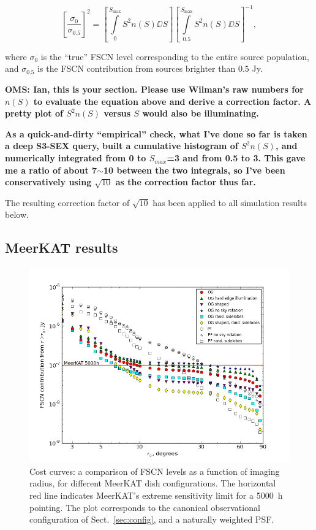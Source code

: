 \documentclass{aa}
\begin{document}
\begin{equation}
\left [ \frac{\sigma_\mathrm{0}}{\sigma_\mathrm{0.5}}\right ]^2 = 
\left [ \int\limits_{0}^{S_\mathrm{max}} S^2n(S)\DD{S} \right ] 
\left [ \int\limits_{0.5}^{S_\mathrm{max}} S^2n(S)\DD{S} \right ]^{-1},
\end{equation}

where $\sigma_0$ is the ``true'' FSCN level corresponding to the entire source population, and $\sigma_{0.5}$ is the FSCN contribution from sources brighter than $0.5$ Jy.

{\bf OMS: Ian, this is your section. Please use Wilman's raw numbers for $n(S)$ to evaluate the equation above and derive a correction factor. A pretty plot of $S^2n(S)$ versus $S$ would also be illuminating.}

{\bf As a quick-and-dirty ``empirical'' check, what I've done so far is taken a deep S3-SEX query, built a cumulative histogram of $S^2n(S)$, and numerically integrated from 0 to $S_{max}$=3 and from 0.5 to 3. This gave me a ratio of about 7$\sim$10 between the two integrals, so I've been conservatively using $\sqrt{10}$ as the correction factor thus far.}

The resulting correction factor of $\sqrt{10}$ has been applied to all simulation results below. 



\subsection{MeerKAT results}
\label{sec:meerkat-costcurve}

\begin{figure}
  \includegraphics[width=\columnwidth]{costcurve-main}
\caption{\label{fig:cc-main}Cost curves: a comparison of FSCN levels as a function of imaging radius, for different MeerKAT dish configurations. The horizontal red line indicates MeerKAT's extreme sensitivity limit for a 5000~h pointing. The plot corresponds to the canonical observational configuration of Sect.~\ref{sec:config}, and a naturally weighted PSF.}
\end{figure}
\end{document}
